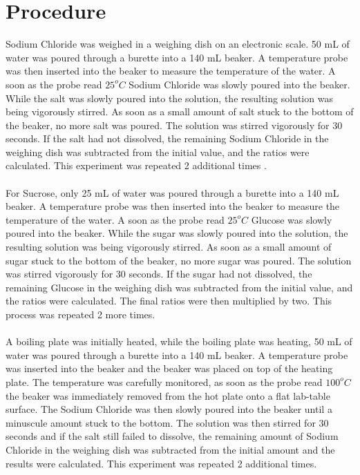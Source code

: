 \documentclass{article}
\begin{document}
\section*{Procedure}
Sodium Chloride was weighed in a weighing dish on an electronic scale. 50 mL of water was poured through a burette into a 140 mL beaker. A temperature probe was then inserted into the beaker to measure the temperature of the water. A soon as the probe read $25^o C$  Sodium Chloride was slowly poured into the beaker. While the salt was slowly poured into the solution, the resulting solution was being vigorously stirred. As soon as a small amount of salt stuck to the bottom of the beaker, no more salt was poured. The solution was stirred vigorously for 30 seconds. If the salt had not dissolved, the remaining Sodium Chloride in the weighing dish was subtracted from the initial value, and the ratios were calculated. This experiment was repeated 2 additional times .\\\\
For Sucrose, only 25 mL of water was poured through a burette into a 140 mL beaker.  A temperature probe was then inserted into the beaker to measure the temperature of the water. A soon as the probe read $25^o C$  Glucose was slowly poured into the beaker. While the sugar was slowly poured into the solution, the resulting solution was being vigorously stirred. As soon as a small amount of sugar stuck to the bottom of the beaker, no more sugar was poured. The solution was stirred vigorously for 30 seconds. If the sugar had not dissolved, the remaining Glucose in the weighing dish was subtracted from the initial value, and the ratios were calculated. The final ratios were then multiplied by two. This process was repeated 2 more times.  \\\\
A boiling plate was initially heated, while the boiling plate was heating, 50 mL of water was poured through a burette into a 140 mL beaker. A temperature probe was inserted into the beaker and the beaker was placed on top of the heating plate. The temperature was carefully monitored, as soon as the probe read $100^o C$ the beaker was immediately removed from the hot plate onto a flat lab-table surface. The Sodium Chloride was then slowly poured into the beaker until a minuscule amount stuck to the bottom. The solution was then stirred for 30 seconds and if the salt still failed to dissolve, the remaining amount of Sodium Chloride in the weighing dish was subtracted from the initial amount and the results were calculated. This experiment was repeated 2 additional times. 
\end{document}
